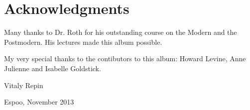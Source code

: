 \settxtgeometry

\section*{Acknowledgments}

\noindent Many thanks to Dr. Roth for his outstanding course on the Modern and the Postmodern. His lectures made this album possible.
\smallskip

\noindent My very special thanks to the contibutors to this album: Howard Levine, Anne Julienne and Isabelle Goldstick.
\bigskip

\noindent Vitaly Repin
\medskip

\noindent Espoo, November 2013
\restoregeometry

